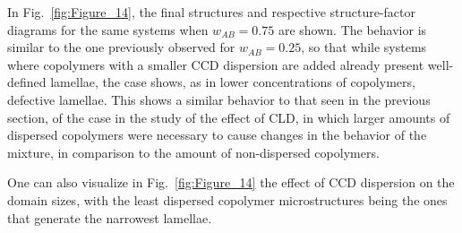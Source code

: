 \documentclass[
aip,
jcp,
reprint,
]{revtex4-1}
\begin{document}
In Fig.~\ref{fig:Figure_14}, the final structures and respective structure-factor diagrams for the same systems when $w_{AB}=0.75$ are shown.
The behavior is similar to the one previously observed for $w_{AB}=0.25$, so that while systems where copolymers with a smaller CCD dispersion are added already present well-defined lamellae, the  case shows, as in lower concentrations of copolymers,  defective lamellae.
This shows a similar behavior to that seen in the previous section, of the case in the study of the effect of CLD, in which larger amounts of dispersed copolymers were necessary to cause changes in the behavior of the mixture, in comparison to the amount of non-dispersed copolymers.

One can also visualize in Fig.~\ref{fig:Figure_14} the effect of CCD dispersion on the domain sizes, with the least dispersed copolymer microstructures being the ones that generate the narrowest lamellae.
\end{document}
